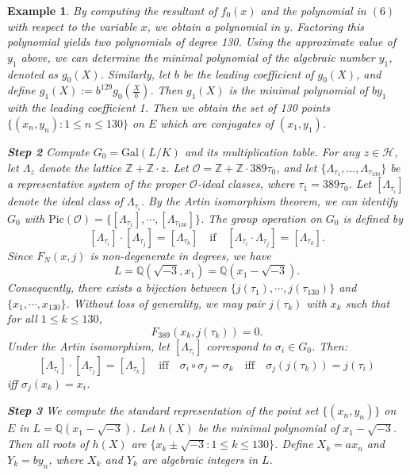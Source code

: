 \documentclass[10pt, a4paper]{article}
\newtheorem{example}[theorem]{Example}
\begin{document}
\begin{example}
By computing the resultant of \( f_0(x) \) and  the polynomial  in $(6)$ with respect to the variable \( x \), we obtain a polynomial in \( y \). Factoring this polynomial yields two polynomials of degree 130. Using the approximate value of \( y_1 \) above, we can determine the minimal polynomial of the algebraic number \( y_1\), denoted as \( g_0(X) \). Similarly, let \( b \) be the leading coefficient of \( g_0(X) \),  and define \( g_1(X) := b^{129} g_0\left(\frac{X}{b}\right) \). Then \( g_1(X) \) is the minimal polynomial of \( b y_1 \) with the leading coefficient 1.
Then  we obtain the set of 130 points \( \{(x_n, y_n) : 1 \leq n \leq 130\} \) on \( E \) which are conjugates  of  \( (x_1, y_1) \).

{\bf Step 2}  Compute \( G_0 = \text{Gal}(L/K) \) and its multiplication table. For any \( z \in \mathcal{H} \), let \( \Lambda_z \) denote the lattice \( \mathbb{Z} + \mathbb{Z} \cdot z \). Let \( \mathcal{O} = \mathbb{Z} + \mathbb{Z} \cdot 389\tau_0 \), and let \( \{\Lambda_{\tau_1}, \dots, \Lambda_{\tau_{130}}\} \) be a representative system of the proper \( \mathcal{O} \)-ideal classes, where \( \tau_1 = 389\tau_0 \).
 Let \( [\Lambda_{\tau_i}] \) denote the ideal class of \( \Lambda_{\tau_i} \). By the Artin isomorphism theorem, we can identify \( G_0 \) with $\text{Pic}(\mathcal{O}) = \{ [\Lambda_{\tau_1}], \cdots, [\Lambda_{\tau_{130}}] \}$. The group operation on $G_0$ is defined by
\[
[\Lambda_{\tau_i}] \cdot [\Lambda_{\tau_j}] = [\Lambda_{\tau_k}] \quad \text{if} \quad [\Lambda_{\tau_i}\cdot\Lambda_{\tau_j}] = [\Lambda_{\tau_k}].
\]
Since $F_N(x,j)$ is non-degenerate in degrees, we have $$L = \mathbb{Q}(\sqrt{-3}, x_1) = \mathbb{Q}(x_1 - \sqrt{-3}).$$ Consequently, there exists a bijection between $\{ j(\tau_1), \cdots, j(\tau_{130}) \}$ and $\{ x_1, \cdots, x_{130} \}$.
Without loss of generality, we may pair $j(\tau_k)$ with $x_k$ such that for all $1 \leq k \leq 130$,
\[
F_{389}(x_k, j(\tau_k)) = 0.
\]
Under the Artin isomorphism, let $[\Lambda_{\tau_i}]$ correspond to $\sigma_i \in G_0$. Then:
\[
[\Lambda_{\tau_i}] \cdot [\Lambda_{\tau_j}] = [\Lambda_{\tau_k}] \quad \text{iff} \quad \sigma_i \circ \sigma_j = \sigma_k \quad \text{iff} \quad \sigma_j(j(\tau_k)) = j(\tau_i)
\]
iff $\sigma_j(x_k) = x_i$.

{\bf Step 3}  We compute the standard representation of the point set $\{(x_n, y_n)\}$ on $E$ in $L = \mathbb{Q}(x_1 - \sqrt{-3})$. Let $h(X)$ be the minimal polynomial of $x_1 - \sqrt{-3}$. Then all roots of $h(X)$ are $\{ x_k \pm \sqrt{-3} : 1 \leq k \leq 130 \}$. Define $X_k = ax_n$ and $Y_k = by_n$, where $X_k$ and $Y_k$ are algebraic integers in $L$.


\end{example}
\end{document}
